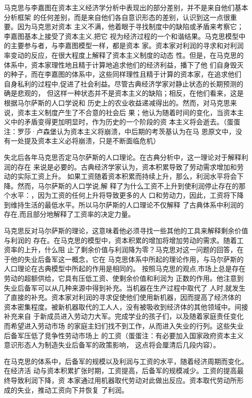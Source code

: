 马克思与李嘉图在资本主义经济学分析中表现出的部分差别，并不是来自他们基本分析框架
的任何差别，而是来自他们各自意识形态的差别，认识到这一点很重要。因为马克思对资本
主义不满，他着眼于寻找制度中的缺陷或矛盾来考察它；李嘉图基本上接受了资本主义,把它
视为经济过程的一个和谐结果。马克思模型中的主要参与者，与李嘉图模型一样，都是资本
家。资本家对利润的寻求和对利润率变动的反应，在很大程度上解释了资本主义制度的动态
性。但是，在马克思的体系中，资本家理性地且精于计算地追求他们的经济利益，播下了他
们自身毁灭的种子，而在李嘉图的体系中，这些同样理性且精于计算的资本家，在追求他们
自身私利的过程中,促进了社会利益。尽管古典经济学家对静止状态的长期预测的确是悲观的，
但这样一种状态并不是资本主义的缺陷；相反，在他们看来，这是根据马尔萨斯的人口学说和
历史上的农业收益递减得出的。然而，对马克思来说，资本主义制度产生了不合意的社会后
果；他认为随着时间的变化，当资本主义中的矛盾变得更加明显时，作为历史的一个阶段的资
本主义将会逝去。（蛋蛋注：罗莎·卢森堡认为资本主义将崩溃，中后期的考茨基认为在马
恩原文中，没有一处提及资本主义必将崩溃，只是不断面临危机）

失北后各年马克思否定马尔萨斯的人口理论。在古典分析中，这一理论对于解释利润的存在
来说是必要的。古典经济学家认为，资本积累导致了劳动需求增加和劳动的实际工资上升。
如果工资随着资本积累而持续上升，那么，利润水平将会下降。然而，马尔萨斯的人口学说,解
释了为什么工资不上升到使利润停止存在的那个水平：，因为工资的任何上升将导致更多的人
口和劳动力，因此，工资将下降到维持生活的最低水平。所以马尔萨斯的人口理论不仅解释
了古典体系中利润的存在,而且部分地解释了工资率的决定力量。

马克思反对马尔萨斯的理论，这意味着他必须寻找一些其他的工具来解释剩余价值与利润的
存在。在马克思的模型中，资本积累的增加将增加劳动的需求。随着工资率的上升，什么阻
止了剩余价值与利润降为零？马克思对这一问题的回答，在于他的失业后备军这一概念，它在
马克思体系中所起的理论作用，与马尔萨斯的人口理论在古典模型中所起的作用是相同的。
按照马克思的观点,市场上总是存在劳动的超额供给，它具有压低工资、使剩余价值和利润为
正数的作用。他注意到失业后备军可以从几种来源中得到补充。当机器在生产过程中取代了
人时,就发生了直接的补充。资本家对利润的寻求促使他们使用新机器，因而提高了经济体的
资本密集程度。被新机器取代的工人人，没有被吸收到经济体的其他领域中。间接补充来自
于新成员进入劳动力大军。完成学业的孩子们，以及随着家庭责任变化而希望进入劳动市场
的家庭主妇们找不到工作，从而进入失业的行列。这些失业后备军压低了竞争性劳动市场上
的工资（蛋蛋注：有必要加入国家政府资本主义意识形态人为制造失业后备军的政策影响，
这点将会厘清后几段内容）。

在马克思的体系中，后备军的规模以及利润与工资的水平，随着经济周期而变化。在经济活
动与资本积累扩张时期，工资提高，后备军的规模减少。工资的提高最终导致利润下降，资
本家通过用机器取代劳动对此做出反应。资本取代劳动所形成的失业，推动工资向下并恢复
了利润。

